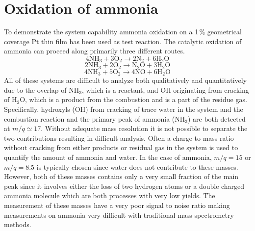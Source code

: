 \documentclass[aip,rsi]{revtex4-1}
\begin{document}
\section{Oxidation of ammonia}
To demonstrate the system capability ammonia oxidation on a 1\,\% geometrical coverage Pt thin film has been used as test reaction. The catalytic oxidation of ammonia can proceed along primarily three different routes\cite{Imbihl2007}.
\begin{equation}
4\mathrm{NH}_3+3\mathrm{O}_2\rightarrow 2\mathrm{N}_2 + 6\mathrm{H}_2\mathrm{O}
\label{eq:Pt_clean_combustion}
\end{equation}
\begin{equation}
2\mathrm{NH}_3+2\mathrm{O}_2\rightarrow \mathrm{N}_2\mathrm{O} + 3\mathrm{H}_2\mathrm{O}
\end{equation}
\begin{equation}
4\mathrm{NH}_3+5\mathrm{O}_2\rightarrow 4\mathrm{NO} + 6\mathrm{H}_2\mathrm{O}
\end{equation}
All of these systems are difficult to analyze both qualitatively and quantitatively due to the overlap of NH$_3$, which is a reactant, and OH originating from cracking of H$_2$O, which is a product from the combustion and is a part of the residue gas. Specifically, hydroxyls (OH) from cracking of trace water in the system and the combustion reaction and the primary peak of ammonia (NH$_{3}$) are both detected at $m/q\simeq17$. Without adequate mass resolution it is not possible to separate the two contributions resulting in difficult analysis. Often a charge to mass ratio without cracking from either products or residual gas in the system is used to quantify the amount of ammonia and water. In the case of ammonia, $m/q=15$ or $m/q=8.5$ is typically chosen since water does not contribute to these masses. However, both of these masses contains only a very small fraction of the main peak since it involves either the loss of two hydrogen atoms or a double charged ammonia molecule which are both processes with very low yields. The measurement of these masses have a very poor signal to noise ratio making measurements on ammonia very difficult with traditional mass spectrometry methods.
\end{document}
